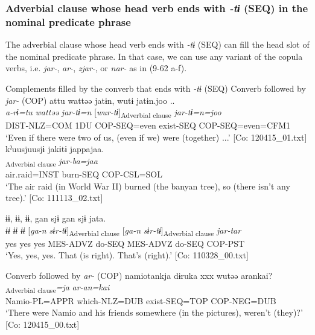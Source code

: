 \subsubsection{Adverbial clause whose head verb ends with \textit{{}-tɨ} (SEQ) in the nominal predicate phrase}\label{sec:9.3.2.2}

The adverbial clause whose head verb ends with \textit{{}-tɨ} (SEQ) can fill the head slot of the nominal predicate phrase. In that case, we can use any variant of the copula verbs, i.e. \textit{jar-}, \textit{ar-}, \textit{zjar-}, or \textit{nar-} as in (9-62 a-f).

\ea   Complements filled by the converb that ends with \textit{{}-tɨ} (SEQ) \label{ex:9.62}
 \exi Converb followed by \textit{jar-} (COP)
\ea %
  \glll   attu  wattəə  jatɨn,  wutɨ   jatɨn.joo ..\\
      \textit{a-rɨ=tu}  \textit{wattəə}  \textit{jar-tɨ=n}  [\textit{wur-tɨ}]\textsubscript{Adverbial clause}    \textit{jar-tɨ=n=joo}\\
      DIST-NLZ=COM  1DU  COP-SEQ=even  exist-SEQ    COP-SEQ=even=CFM1\\
      \glt       ‘Even if there were two of us, (even if we) were (together) ...’ [Co: 120415\_01.txt]
\ex %
    \glll  {\textbar}kˀuusjuu{\textbar}sjɨ  jakɨtɨ  jappajaa.\\
      [\textit{kˀuusjuu=sjɨ}  \textit{jakɨr-tɨ}]\textsubscript{Adverbial clause}  \textit{jar-ba=jaa}\\
      air.raid=INST  burn-SEQ  COP-CSL=SOL\\
      \glt       ‘The air raid (in World War II) burned (the banyan tree), so (there isn’t any tree).’ [Co: 111113\_02.txt]

\ex %
      \glll ɨɨ,  ɨɨ,  ɨɨ,  gan  sjɨ  gan   sjɨ  jata.\\
      \textit{ɨɨ}  \textit{ɨɨ}  \textit{ɨɨ}  [\textit{ga-n}  \textit{sɨr-tɨ}]\textsubscript{Adverbial clause}  [\textit{ga-n}  \textit{sɨr-tɨ}]\textsubscript{Adverbial clause}  \textit{jar-tar}\\
      yes  yes  yes  MES-ADVZ  do-SEQ  MES-ADVZ       do-SEQ  COP-PST\\
      \glt   ‘Yes, yes, yes. That (is right). That’s (right).’   [Co: 110328\_00.txt]

\exi{} Converb followed by \textit{ar-} (COP)
\ex %
    \glll  namiotankja  dɨruka  xxx  wutəə    arankai?\\
      [\textit{namio-taa=nkja}  \textit{dɨ-ru=ka}    \textit{wur-tɨ}]\textsubscript{Adverbial clause}\textit{=ja}    \textit{ar-an=kai}\\
      Namio-PL=APPR  which-NLZ=DUB    exist-SEQ=TOP   COP-NEG=DUB\\
      \glt       ‘There were Namio and his friends somewhere (in the pictures), weren’t (they)?’ [Co: 120415\_00.txt]

